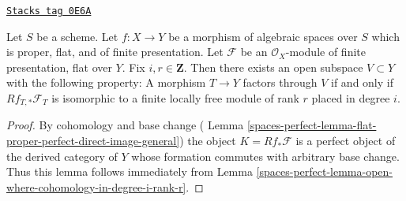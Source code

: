 \begin{lemma}
\label{spaces-perfect-lemma-open-where-cohomology-in-degree-i-rank-r-geometric}
\href{https://stacks.math.columbia.edu/tag/0E6A}{\texttt{Stacks tag 0E6A}}

Let $S$ be a scheme.
Let $f : X \to Y$ be a morphism of algebraic spaces over $S$
which is proper, flat, and of finite presentation.
Let $\mathcal{F}$ be an $\mathcal{O}_X$-module of finite presentation,
flat over $Y$. Fix $i, r \in \mathbf{Z}$.
Then there exists an open subspace
$V \subset Y$ with the following property:
A morphism $T \to Y$ factors through $V$ if and only if
$Rf_{T, *}\mathcal{F}_T$ is isomorphic to a
finite locally free module of rank $r$ placed in degree $i$.
\end{lemma}

\begin{proof}
By cohomology and base change (
Lemma \ref{spaces-perfect-lemma-flat-proper-perfect-direct-image-general})
the object $K = Rf_*\mathcal{F}$ is a perfect object of the derived
category of $Y$ whose formation commutes with arbitrary base change.
Thus this lemma follows immediately from
Lemma \ref{spaces-perfect-lemma-open-where-cohomology-in-degree-i-rank-r}.
\end{proof}

